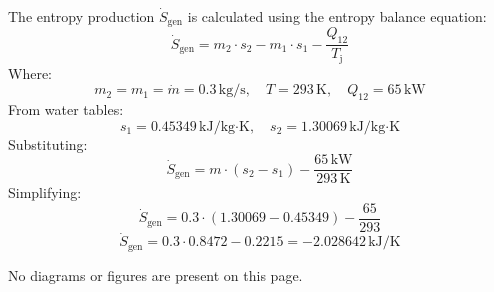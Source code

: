 The entropy production \( \dot{S}_{\text{gen}} \) is calculated using the entropy balance equation:  
\[
\dot{S}_{\text{gen}} = m_2 \cdot s_2 - m_1 \cdot s_1 - \frac{Q_{12}}{T_{\text{j}}}
\]  
Where:  
\[
m_2 = m_1 = \dot{m} = 0.3 \, \text{kg/s}, \quad T = 293 \, \text{K}, \quad Q_{12} = 65 \, \text{kW}
\]  
From water tables:  
\[
s_1 = 0.45349 \, \text{kJ/kg·K}, \quad s_2 = 1.30069 \, \text{kJ/kg·K}
\]  
Substituting:  
\[
\dot{S}_{\text{gen}} = m \cdot (s_2 - s_1) - \frac{65 \, \text{kW}}{293 \, \text{K}}
\]  
Simplifying:  
\[
\dot{S}_{\text{gen}} = 0.3 \cdot (1.30069 - 0.45349) - \frac{65}{293}
\]  
\[
\dot{S}_{\text{gen}} = 0.3 \cdot 0.8472 - 0.2215 = -2.028642 \, \text{kJ/K}
\]  

No diagrams or figures are present on this page.
